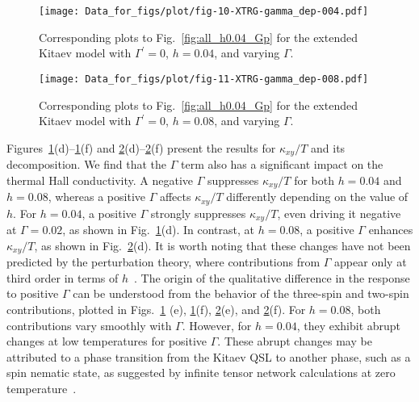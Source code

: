 \documentclass[twocolumn,superscriptaddress,showpacs, longbibliography, aps, prx]{revtex4-2}
\begin{document}
\begin{figure}
  \begin{center}
    \texttt{[image: Data\_for\_figs/plot/fig-10-XTRG-gamma\_dep-004.pdf]}
  \end{center}
  \caption{
 Corresponding plots to Fig.~\ref{fig:all_h0.04_Gp} for the extended Kitaev model with $\Gamma^{\prime}=0$, $h=0.04$, and varying $\Gamma$. 
  }
  \label{fig:all_h0.04_G}
\end{figure}
\begin{figure}
  \begin{center}
    \texttt{[image: Data\_for\_figs/plot/fig-11-XTRG-gamma\_dep-008.pdf]}
  \end{center}
  \caption{
   Corresponding plots to Fig.~\ref{fig:all_h0.04_Gp} for the extended Kitaev model with $\Gamma^{\prime}=0$, $h=0.08$, and varying $\Gamma$. 
  }
  \label{fig:all_h0.08_G}
\end{figure}

Figures~\ref{fig:all_h0.04_G}(d)--\ref{fig:all_h0.04_G}(f) and \ref{fig:all_h0.08_G}(d)--\ref{fig:all_h0.08_G}(f) present the results for $\kappa_{xy}/T$ and its decomposition. 
We find that the $\Gamma$ term also has a significant impact on the thermal Hall conductivity. 
A negative $\Gamma$ suppresses $\kappa_{xy}/T$ for both $h = 0.04$ and $h=0.08$, whereas a positive $\Gamma$ affects $\kappa_{xy}/T$ differently depending on the value of $h$.
For $h=0.04$, a positive $\Gamma$ strongly suppresses $\kappa_{xy}/T$, even driving it negative at $\Gamma = 0.02$, as shown in Fig.~\ref{fig:all_h0.04_G}(d). In contrast, at $h=0.08$, a positive $\Gamma$ enhances $\kappa_{xy}/T$, as shown in Fig.~\ref{fig:all_h0.08_G}(d). 
It is worth noting that these changes have not been predicted by the perturbation theory, where contributions from $\Gamma$ appear only at third order in terms of $h$~\cite{YamadaF2021}. 
The origin of the qualitative difference in the response to positive $\Gamma$ can be understood from the behavior of the three-spin and two-spin contributions, plotted in Figs.~\ref{fig:all_h0.04_G}
(e), \ref{fig:all_h0.04_G}(f), \ref{fig:all_h0.08_G}(e), and \ref{fig:all_h0.08_G}(f). 
For $h=0.08$, both contributions vary smoothly with $\Gamma$. 
However, for $h=0.04$, they exhibit abrupt changes at low temperatures for positive $\Gamma$. 
These abrupt changes may be attributed to a phase transition from the Kitaev QSL to another phase, such as a spin nematic state, as suggested by infinite tensor network calculations at zero temperature~\cite{Lee_NCom2020}.
\end{document}
